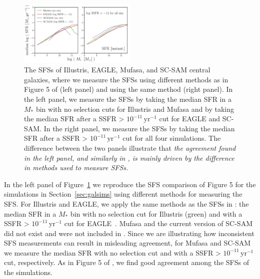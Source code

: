 \documentclass[tighten, preprint]{aastex62}
\begin{document}
\begin{figure}
\begin{center}
\includegraphics[width=0.5\textwidth]{Catalog_SFS_lit.pdf} 
\caption{The SFSs of Illustris, EAGLE, {\sc Mufasa}, and SC-SAM central 
galaxies, where we measure the SFSs using different methods as in Figure 5 
of \cite{somerville2015} (left panel) and using the same method (right panel). 
In the left panel, we measure the SFSs by taking the median SFR in 
a $M_*$ bin with no selection cuts for Illustris and {\sc Mufasa}
and by taking the median SFR after a SSFR > $10^{-11}\, \mathrm{yr}^{-1}$ cut 
for EAGLE and SC-SAM. In the right panel, we measure the SFSs by taking 
the median SFR after a SSFR > $10^{-11}\,\mathrm{yr}^{-1}$ cut for all four simulations.
The difference between the two panels illustrate that \emph{the agreement 
found in the left panel, and similarly in \cite{somerville2015},
is mainly driven by the difference in methods used to measure SFSs.}
} 
\label{fig:likeSD14}
\end{center}
\end{figure}

In the left panel of Figure~\ref{fig:likeSD14} we reproduce the SFS comparison of 
\cite{somerville2015} Figure 5 for the simulations in Section~\ref{sec:galsims}
using different methods for measuring the SFS. For Illustris and EAGLE, we apply
the same methods as the SFSs in \cite{somerville2015}: 
the median SFR in a $M_*$ bin with no selection cut for Illustris (green) and 
with a SSFR > $10^{-11}\, \mathrm{yr}^{-1}$ cut for EAGLE~\citep[red;][]{schaye2015}. 
{\sc Mufasa} and the current version of SC-SAM did not exist and were not 
included in \cite{somerville2015}. Since we are illustrating how inconsistent 
SFS measurements can result in misleading agreement, for {\sc Mufasa} and 
SC-SAM we measure the median SFR with no selection cut and with a SSFR > 
$10^{-11}\, \mathrm{yr}^{-1}$ cut, respectively. As in Figure 5 of \cite{somerville2015}, 
we find good agreement among the SFSs of the simulations. 
\end{document}

